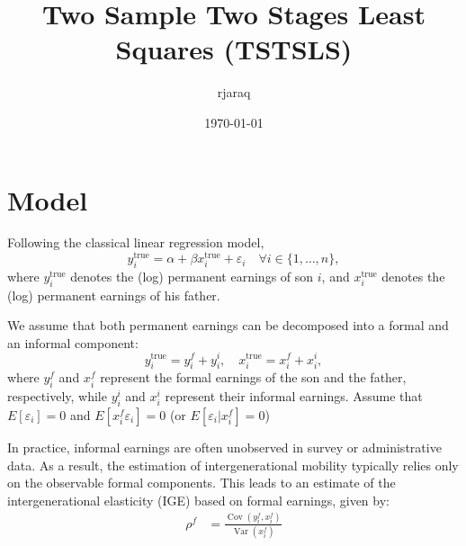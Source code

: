 \documentclass[12pt,oneside]{article}
\title{Two Sample Two Stages Least Squares (TSTSLS)}
\author{rjaraq}
\date{\today}
\theoremstyle{bracket}
\begin{document}
\maketitle
\section{Model}
Following the classical linear regression model,
\begin{equation}
y^{\text{true}}_i = \alpha + \beta x^{\text{true}}_i + \varepsilon_i \quad \forall i \in \{1, \ldots, n\},
\end{equation}
where $y^{\text{true}}_i$ denotes the (log) permanent earnings of son $i$, and $x^{\text{true}}_i$ denotes the (log) permanent earnings of his father.

We assume that both permanent earnings can be decomposed into a formal and an informal component:
\begin{equation}
y_i^{\text{true}} = y_i^f + y_i^i, \quad x_i^{\text{true}} = x_i^f + x_i^i,
\end{equation}
where $y_i^f$ and $x_i^f$ represent the formal earnings of the son and the father, respectively, while $y_i^i$ and $x_i^i$ represent their informal earnings. Assume that $E[\varepsilon_i]=0$ and $E[x_i^f\varepsilon_i]=0$ (or $E[\varepsilon_i|x_i^f]=0$)

In practice, informal earnings are often unobserved in survey or administrative data. As a result, the estimation of intergenerational mobility typically relies only on the observable formal components. This leads to an estimate of the intergenerational elasticity (IGE) based on formal earnings, given by:
\begin{align}
\rho^{f} &= \frac{\operatorname{Cov}(y_i^f, x_i^f)}{\operatorname{Var}(x_i^f)}
\end{align}
\end{document}
